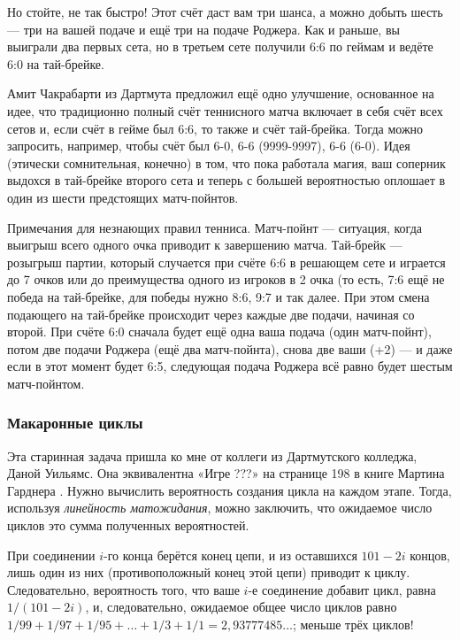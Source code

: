 Но стойте, не так быстро!
Этот счёт даст вам три шанса, а можно добыть шесть --- три на вашей подаче и ещё три на подаче Роджера.
Как и раньше, вы выиграли два первых сета, но в третьем сете получили 6:6 по геймам и ведёте 6:0 на тай-брейке.

Амит Чакрабарти из Дартмута предложил ещё одно улучшение, основанное на идее, что традиционно полный счёт теннисного матча включает в себя счёт всех сетов и, если счёт в гейме был 6:6, то также и счёт тай-брейка.
Тогда можно запросить, например, чтобы счёт был 6-0, 6-6 (9999-9997), 6-6 (6-0).
Идея (этически сомнительная, конечно) в том, что пока работала магия, ваш соперник выдохся в тай-брейке второго сета и теперь с большей вероятностью оплошает в один из шести предстоящих матч-пойнтов.

\begin{addedbytheeditors}
Примечания для незнающих правил тенниса.
Матч-пойнт --- ситуация, когда выигрыш всего одного очка приводит к завершению матча.
Тай-брейк --- розыгрыш партии, который
случается при счёте 6:6 в решающем сете и играется до 7 очков или до
преимущества
одного из игроков в 2 очка (то есть, 7:6 ещё не победа на тай-брейке, для победы нужно 8:6, 9:7 и так далее. При этом смена подающего на тай-брейке происходит через каждые две подачи, начиная со второй.
При счёте 6:0 сначала будет ещё одна ваша подача (один матч-пойнт), потом две подачи Роджера (ещё два матч-пойнта), снова две ваши (+2) --- и даже если в этот момент будет 6:5, следующая подача Роджера всё равно будет шестым матч-пойнтом.
\end{addedbytheeditors}

\subsubsection*{Макаронные циклы}

Эта старинная задача пришла ко мне от коллеги из Дартмутского колледжа, Даной Уильямс.
Она эквивалентна «Игре ???» на странице 198 в книге Мартина Гарднера \cite{26}.
Нужно вычислить вероятность создания цикла на каждом этапе.
Тогда, используя \emph{линейность матожидания}, можно заключить, что ожидаемое число циклов это сумма полученных вероятностей.

При соединении $i$-го конца берётся конец цепи, и из оставшихся $101 - 2i$ концов, лишь один из них (противоположный конец этой цепи) приводит к циклу.
Следовательно, вероятность того, что ваше $i$-е соединение добавит цикл, равна $1/(101 - 2i)$, и, следовательно, ожидаемое общее число циклов равно $1/99 + 1/97 + 1/95 +\dots + 1/3 + 1/1 = 2{,}93777485\dots$; меньше трёх циклов!

